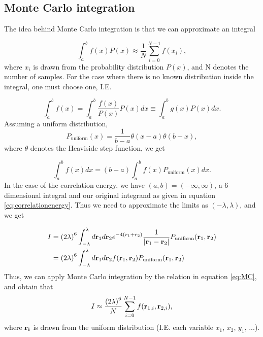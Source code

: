 \documentclass{emulateapj}
\begin{document}
\subsection{Monte Carlo integration}
The idea behind Monte Carlo integration is that we can approximate an integral

\begin{equation} \label{eq:MC}
    \int_a^b f\left(x\right) P\left(x\right) \approx \frac{1}{N}\sum_{i=0}^{N-1} f\left(x_i\right),
\end{equation}
where $x_i$ is drawn from the probability distribution $P\left(x\right)$, and N denotes the number of samples. For the case where there is no known distribution inside the integral, one must choose one, I.E.

\begin{equation}
    \int_a^b f\left(x\right) = \int_a^b \frac{f\left(x\right)}{P\left(x\right)}P\left(x\right) dx \equiv \int_a^b g\left(x\right) P\left(x\right) dx.
\end{equation}
Assuming a uniform distribution,
\begin{equation}
    P_\text{uniform}(x) = \frac{1}{b-a}\theta\left(x-a\right)\theta\left(b-x\right),
\end{equation}
where $\theta$ denotes the Heaviside step function, we get

\begin{equation}
    \int_a^b f(x) dx = \left(b-a\right) \int_a^b f(x) P_\text{uniform}(x) dx.
\end{equation}
In the case of the correlation energy, we have $(a,b) = (-\infty,\infty)$, a 6-dimensional integral and our original integrand as given in equation \ref{eq:correlationenergy}. Thus we need to approximate the limits as $(-\lambda,\lambda)$, and we get

\begin{align*}
    I &= \left(2\lambda\right)^6 \int_{-\lambda}^{\lambda} d{\bf r}_1d{\bf r}_2  e^{-4 (r_1+r_2)}\frac{1}{|{\bf r}_1-{\bf r}_2|} P_\text{uniform}({\bf r}_1, {\bf r}_2) \\
    &= \left(2\lambda\right)^6 \int_{-\lambda}^{\lambda} d{\bf r}_1d{\bf r}_2 f({\bf r}_1, {\bf r}_2) P_\text{uniform}({\bf r}_1, {\bf r}_2)
\end{align*}
Thus, we can apply Monte Carlo integration by the relation in equation \ref{eq:MC}, and obtain that
\begin{equation}
    I \approx \frac{\left(2\lambda\right)^6}{N}\sum_{i=0}^{N-1} f({\bf r}_{1,i}, {\bf r}_{2,i}),
\end{equation}
where $\bf r_i$ is drawn from the uniform distribution (I.E. each variable $x_1$, $x_2$, $y_1$, ...).
\end{document}
